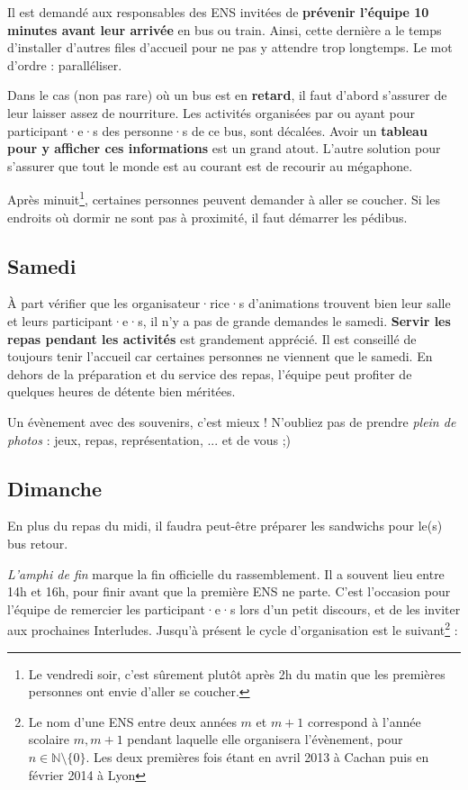 Il est demandé aux responsables des ENS invitées de \textbf{prévenir l'équipe 10 minutes avant leur arrivée} en bus ou train. Ainsi, cette dernière a le temps d'installer d'autres files d'accueil pour ne pas y attendre trop longtemps. Le mot d'ordre : paralléliser.

Dans le cas (non pas rare) où un bus est en \textbf{retard}, il faut d'abord s'assurer de leur laisser assez de nourriture. Les activités organisées par ou ayant pour participant·e·s des personne·s de ce bus, sont décalées. Avoir un \textbf{tableau pour y afficher ces informations} est un grand atout. L'autre solution pour s'assurer que tout le monde est au courant est de recourir au mégaphone.

Après minuit\footnote{Le vendredi soir, c'est sûrement plutôt après 2h du matin que les premières personnes ont envie d'aller se coucher.}, certaines personnes peuvent demander à aller se coucher. Si les endroits où dormir ne sont pas à proximité, il faut démarrer les pédibus.

\subsection{Samedi}

À part vérifier que les organisateur·rice·s d'animations trouvent bien leur salle et leurs participant·e·s, il n'y a pas de grande demandes le samedi. \textbf{Servir les repas pendant les activités} est grandement apprécié.  Il est conseillé de toujours tenir l'accueil car certaines personnes ne viennent que le samedi. En dehors de la préparation et du service des repas, l'équipe peut profiter de quelques heures de détente bien méritées.

\begin{Afaire}{}{}
Un évènement avec des souvenirs, c'est mieux ! N'oubliez pas de prendre \emph{plein de photos} : jeux, repas, représentation, ... et de vous ;)
\end{Afaire}

\subsection{Dimanche}

En plus du repas du midi, il faudra peut-être préparer les sandwichs pour le(s) bus retour.

\emph{L'amphi de fin} marque la fin officielle du rassemblement. Il a souvent lieu entre 14h et 16h, pour finir avant que la première ENS ne parte. C'est l'occasion pour l'équipe de remercier les participant·e·s lors d'un petit discours, et de les inviter aux prochaines Interludes. Jusqu'à présent le cycle d'organisation est le suivant\footnote{Le nom d'une ENS entre deux années $m$ et $m+1$ correspond à l'année scolaire $m, m+1$ pendant laquelle elle organisera l'évènement, pour $n\in \mathbb{N}\setminus\{0\}$. Les deux premières fois étant en avril 2013 à Cachan puis en février 2014 à Lyon} :

